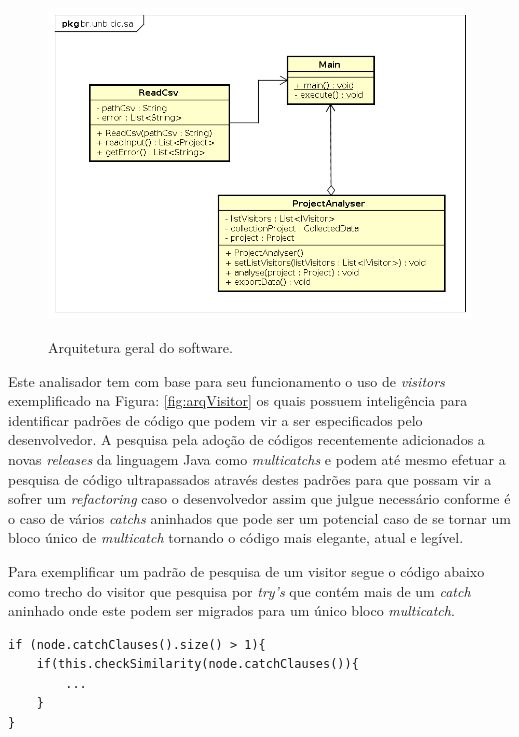 \begin{figure}[h]
	\center
	\includegraphics[scale=0.45]{Imagens/Arquitetura}
	\label{fig:arqGeral}
	\caption{Arquitetura geral do software.}
\end{figure}


Este analisador tem com base para seu funcionamento o uso de {\it visitors} \cite{Gamma:1995} exemplificado na Figura: \ref{fig:arqVisitor} os quais possuem inteligência para identificar padrões de código que podem vir a ser especificados pelo desenvolvedor. A pesquisa pela adoção de códigos recentemente adicionados a novas {\it releases} da linguagem Java como {\it multicatchs} e podem até mesmo efetuar a pesquisa de código ultrapassados através destes padrões para que possam vir a sofrer um \textit{refactoring} caso o desenvolvedor assim que julgue necessário conforme é o caso de vários {\it catchs} aninhados que pode ser um potencial caso de se tornar um bloco único de {\it multicatch} tornando o código mais elegante, atual e legível.

Para exemplificar um padrão de pesquisa de um visitor segue o código abaixo como trecho do visitor que pesquisa por \textit{try's} que contém mais de um \textit{catch} aninhado onde este podem ser migrados para um único bloco \textit{multicatch}. 
\begin{lstlisting}
if (node.catchClauses().size() > 1){
	if(this.checkSimilarity(node.catchClauses()){
		...
	}
}
\end{lstlisting}


